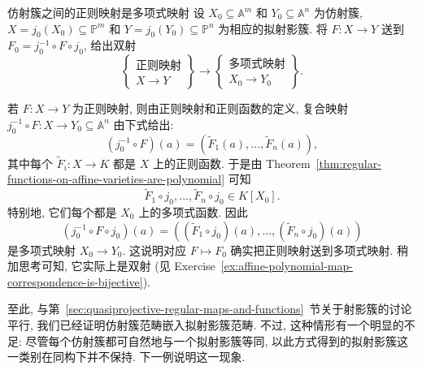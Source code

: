 \begin{Corollary}{仿射簇之间的正则映射是多项式映射}\leavevmode\label{cor:regular-maps-between-affine-varieties-are-polynomial}
设 $X_{0}\subseteq\mathbb{A}^{m}$ 和 $Y_{0}\subseteq\mathbb{A}^{n}$ 为仿射簇, $X=j_{0}(X_{0})\subseteq\mathbb{P}^{m}$ 和 $Y=j_{0}(Y_{0})\subseteq\mathbb{P}^{n}$ 为相应的拟射影簇. 将 $F:X\to Y$ 送到 $F_{0}=j_{0}^{-1}\circ F\circ j_{0}$, 给出双射
\[
  \left\{\begin{gathered}\text{正则映射}\\ X\to Y\end{gathered}\right\}
   \longrightarrow
  \left\{\begin{gathered}\text{多项式映射}\\ X_{0}\to Y_{0}\end{gathered}\right\}.
\]
\end{Corollary}
\begin{Proof}
若 $F:X\to Y$ 为正则映射, 则由正则映射和正则函数的定义, 复合映射 $j_{0}^{-1}\circ F:X\to Y_{0}\subseteq\mathbb{A}^{n}$ 由下式给出:
\[
  (j_{0}^{-1}\circ F)(a)=(\widetilde{F}_{1}(a),\ldots,\widetilde{F}_{n}(a)),
\]
其中每个 $\widetilde{F}_{i}:X\to K$ 都是 $X$ 上的正则函数. 于是由 Theorem~\ref{thm:regular-functions-on-affine-varieties-are-polynomial} 可知
\[
  \widetilde{F}_{1}\circ j_{0},\ldots,\widetilde{F}_{n}\circ j_{0}\in K[X_{0}].
\]
特别地, 它们每个都是 $X_{0}$ 上的多项式函数. 因此
\[
  (j_{0}^{-1}\circ F\circ j_{0})(a)
   =((\widetilde{F}_{1}\circ j_{0})(a),\ldots,(\widetilde{F}_{n}\circ j_{0})(a))
\]
是多项式映射 $X_{0}\to Y_{0}$. 这说明对应 $F\mapsto F_{0}$ 确实把正则映射送到多项式映射. 稍加思考可知, 它实际上是双射 (见 Exercise~\ref{ex:affine-polynomial-map-correspondence-is-bijective}).
\end{Proof}

至此, 与第~\ref{sec:quasiprojective-regular-maps-and-functions}~节关于射影簇的讨论平行, 我们已经证明仿射簇范畴嵌入拟射影簇范畴. 不过, 这种情形有一个明显的不足: 尽管每个仿射簇都可自然地与一个拟射影簇等同, 以此方式得到的拟射影簇这一类别在同构下并不保持. 下一例说明这一现象.

